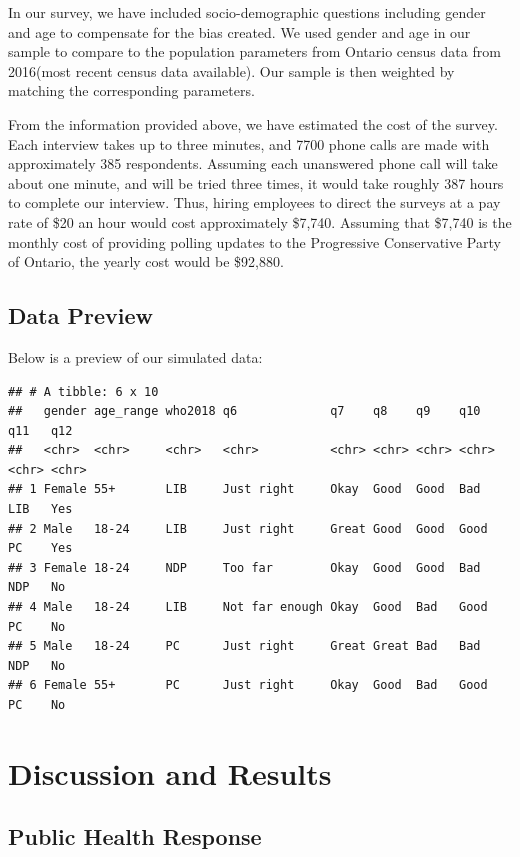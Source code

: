 \documentclass[
]{article}
\begin{document}
In our survey, we have included socio-demographic questions including
gender and age to compensate for the bias created. We used gender and
age in our sample to compare to the population parameters from Ontario
census data from 2016(most recent census data available). Our sample is
then weighted by matching the corresponding parameters.

From the information provided above, we have estimated the cost of the
survey. Each interview takes up to three minutes, and 7700 phone calls
are made with approximately 385 respondents. Assuming each unanswered
phone call will take about one minute, and will be tried three times, it
would take roughly 387 hours to complete our interview. Thus, hiring
employees to direct the surveys at a pay rate of \$20 an hour would cost
approximately \$7,740. Assuming that \$7,740 is the monthly cost of
providing polling updates to the Progressive Conservative Party of
Ontario, the yearly cost would be \$92,880.

\hypertarget{data-preview}{%
\subsection{Data Preview}\label{data-preview}}

Below is a preview of our simulated data:

\begin{verbatim}
## # A tibble: 6 x 10
##   gender age_range who2018 q6             q7    q8    q9    q10   q11   q12  
##   <chr>  <chr>     <chr>   <chr>          <chr> <chr> <chr> <chr> <chr> <chr>
## 1 Female 55+       LIB     Just right     Okay  Good  Good  Bad   LIB   Yes  
## 2 Male   18-24     LIB     Just right     Great Good  Good  Good  PC    Yes  
## 3 Female 18-24     NDP     Too far        Okay  Good  Good  Bad   NDP   No   
## 4 Male   18-24     LIB     Not far enough Okay  Good  Bad   Good  PC    No   
## 5 Male   18-24     PC      Just right     Great Great Bad   Bad   NDP   No   
## 6 Female 55+       PC      Just right     Okay  Good  Bad   Good  PC    No
\end{verbatim}

\newpage

\hypertarget{discussion-and-results}{%
\section{Discussion and Results}\label{discussion-and-results}}

\hypertarget{public-health-response}{%
\subsection{Public Health Response}\label{public-health-response}}
\end{document}
